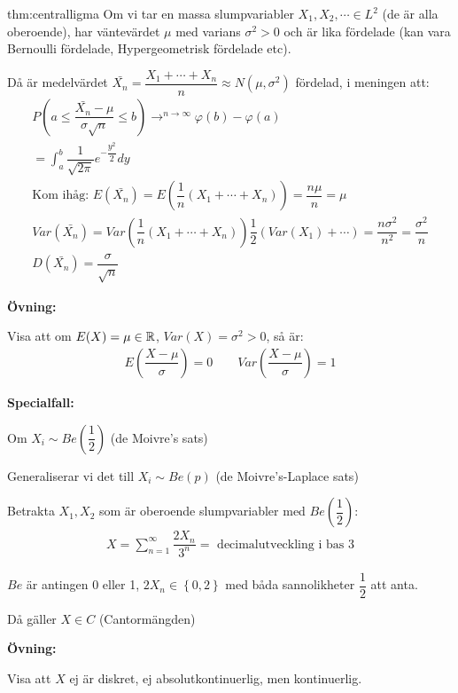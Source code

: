 \newpage
\begin{theo}{thm:centralligma}
  Om vi tar en massa slumpvariabler $X_1,X_2,\cdots\in L^2$ (de är alla oberoende), har väntevärdet $\mu$ med varians $\sigma^2>0$ och är lika fördelade (kan vara Bernoulli fördelade, Hypergeometrisk fördelade etc).
  \par\bigskip
  \noindent Då är medelvärdet $\bar{X_n} =\dfrac{X_1+\cdots+X_n}{n}\approx N(\mu,\sigma^2)$ fördelad, i meningen att:
  \begin{equation*}
    \begin{gathered}
      P\left(a\leq \dfrac{\bar{X_n}-\mu}{\sigma\sqrt{n}}\leq b\right)\to^{n\to\infty}\varphi(b)-\varphi(a)\\
      = \int_{a}^{b}\dfrac{1}{\sqrt{2\pi}}e^{-\dfrac{y^2}{2}}dy\\
      \text{Kom ihåg: } E(\bar{X_n}) = E(\dfrac{1}{n}(X_1+\cdots+X_n)) = \dfrac{n\mu}{n} = \mu\\
      Var(\bar{X_n}) = Var(\dfrac{1}{n}(X_1+\cdots+X_n)) \dfrac{1}{2}\left(Var(X_1)+\cdots\right) = \dfrac{n\sigma^2}{n^2} = \dfrac{\sigma^2}{n}\\
      D(\bar{X_n}) = \dfrac{\sigma}{\sqrt{n}}
    \end{gathered}
  \end{equation*}
\end{theo}
\par\bigskip
\noindent\textbf{Övning:}\par
\noindent Visa att om $E(X) = \mu\in\mathbb{R}$, $Var(X) = \sigma^2>0$, så är:
\begin{equation*}
  \begin{gathered}
    E\left(\dfrac{X-\mu}{\sigma}\right) = 0\qquad Var\left(\dfrac{X-\mu}{\sigma}\right)=1
  \end{gathered}
\end{equation*}
\par\bigskip
\noindent\textbf{Specialfall:}\par
\noindent Om $X_i\sim Be(\dfrac{1}{2})$ (de Moivre's sats)\par
\noindent Generaliserar vi det till $X_i\sim Be(p)$ (de Moivre's-Laplace sats)
\par\bigskip
\noindent Betrakta $X_1,X_2$ som är oberoende slumpvariabler med $Be(\dfrac{1}{2})$:
\begin{equation*}
  \begin{gathered}
    X = \sum_{n=1}^{\infty}\dfrac{2X_n}{3^n}= \text{ decimalutveckling i bas 3}
  \end{gathered}
\end{equation*}\par
\noindent $Be$ är antingen 0 eller 1, $2X_n\in\left\{0,2\right\}$ med båda sannolikheter $\dfrac{1}{2}$ att anta.\par
\noindent Då gäller $X\in C$ (Cantormängden)
\par\bigskip
\noindent\textbf{Övning:}\par
\noindent Visa att $X$ ej är diskret, ej absolutkontinuerlig, men kontinuerlig.
